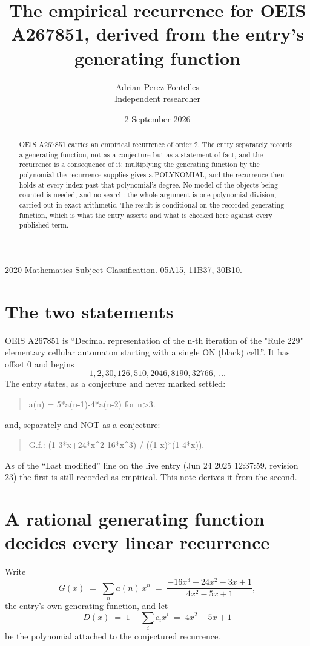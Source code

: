 \documentclass[11pt,a4paper]{article}
\title{The empirical recurrence for OEIS A267851, derived from the entry's generating function}
\author{Adrian Perez Fontelles\\ \small Independent researcher}
\date{2 September 2026}
\theoremstyle{plain}
\theoremstyle{definition}
\begin{document}
\maketitle

\begin{abstract}
OEIS A267851 carries an empirical recurrence of order $2$. The entry separately records a
generating function, not as a conjecture but as a statement of fact, and the recurrence is a
consequence of it: multiplying the generating function by the polynomial the recurrence
supplies gives a POLYNOMIAL, and the recurrence then holds at every index past that
polynomial's degree. No model of the objects being counted is needed, and no search: the
whole argument is one polynomial division, carried out in exact arithmetic. The result is
conditional on the recorded generating function, which is what the entry asserts and what is
checked here against every published term.
\end{abstract}

\noindent\small 2020 Mathematics Subject Classification. 05A15, 11B37, 30B10.\normalsize

\section{The two statements}

OEIS A267851 is ``Decimal representation of the n-th iteration of the "Rule 229" elementary cellular automaton starting with a single ON (black) cell.''. It has offset $0$ and begins
\[
1, 2, 30, 126, 510, 2046, 8190, 32766,\ \dots
\]
The entry states, as a conjecture and never marked settled:
\begin{quote}
a(n) = 5*a(n-1)-4*a(n-2) for n>3.
\end{quote}
and, separately and NOT as a conjecture:
\begin{quote}
G.f.: (1-3*x+24*x\^{}2-16*x\^{}3) / ((1-x)*(1-4*x)).
\end{quote}
As of the ``Last modified'' line on the live entry (Jun 24 2025 12:37:59, revision 23) the first is still
recorded as empirical. This note derives it from the second.

\section{A rational generating function decides every linear recurrence}

Write
\[
G(x)\;=\;\sum_{n}a(n)\,x^{n}\;=\;\frac{- 16 x^{3} + 24 x^{2} - 3 x + 1}{4 x^{2} - 5 x + 1},
\]
the entry's own generating function, and let
\[
D(x)\;=\;1-\sum_i c_i x^{i}\;=\;4 x^{2} - 5 x + 1
\]
be the polynomial attached to the conjectured recurrence.
\end{document}
